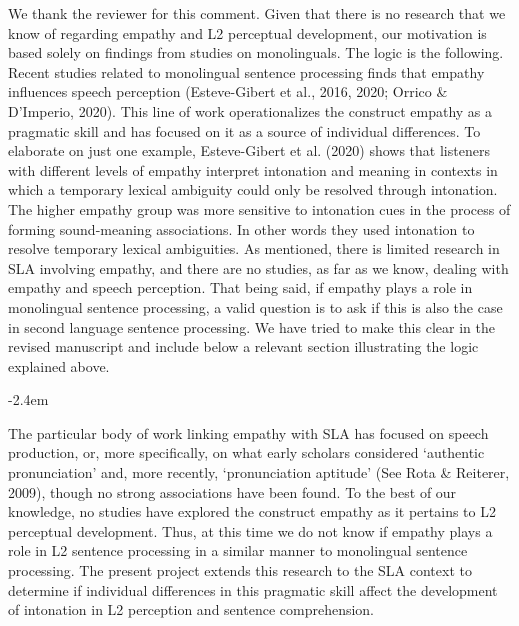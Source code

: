 \documentclass[]{article}
\renewenvironment{quote}{\begin{fquote}\advance\leftmargini -2.4em\begin{oldquote}}{\end{oldquote}\end{fquote}}
\newenvironment{fquote}
  {\def\FrameCommand{
	\fboxsep=0.6em %
	\fcolorbox{black}{white}}%
    \MakeFramed {\advance\hsize-2\width \FrameRestore}
    \begin{minipage}{\linewidth}
  }
  {\end{minipage}\endMakeFramed}
\begin{document}
We thank the reviewer for this comment.
Given that there is no research that we know of regarding empathy and L2 perceptual development, our motivation is based solely on findings from studies on monolinguals.
The logic is the following.\\
Recent studies related to monolingual sentence processing finds that empathy influences speech perception (Esteve-Gibert et al., 2016, 2020; Orrico \& D'Imperio, 2020).
This line of work operationalizes the construct empathy as a pragmatic skill and has focused on it as a source of individual differences.
To elaborate on just one example, Esteve-Gibert et al. (2020) shows that listeners with different levels of empathy interpret intonation and meaning in contexts in which a temporary lexical ambiguity could only be resolved through intonation.
The higher empathy group was more sensitive to intonation cues in the process of forming sound-meaning associations.
In other words they used intonation to resolve temporary lexical ambiguities.
As mentioned, there is limited research in SLA involving empathy, and there are no studies, as far as we know, dealing with empathy and speech perception.
That being said, if empathy plays a role in monolingual sentence processing, a valid question is to ask if this is also the case in second language sentence processing.
We have tried to make this clear in the revised manuscript and include below a relevant section illustrating the logic explained above.

\begin{quote}
The particular body of work linking empathy with SLA has focused on speech production, or, more specifically, on what early scholars considered `authentic pronunciation' and, more recently, `pronunciation aptitude' (See Rota \& Reiterer, 2009), though no strong associations have been found.
To the best of our knowledge, no studies have explored the construct empathy as it pertains to L2 perceptual development.
Thus, at this time we do not know if empathy plays a role in L2 sentence processing in a similar manner to monolingual sentence processing.
The present project extends this research to the SLA context to determine if individual differences in this pragmatic skill affect the development of intonation in L2 perception and sentence comprehension.
\end{quote}
\end{document}
